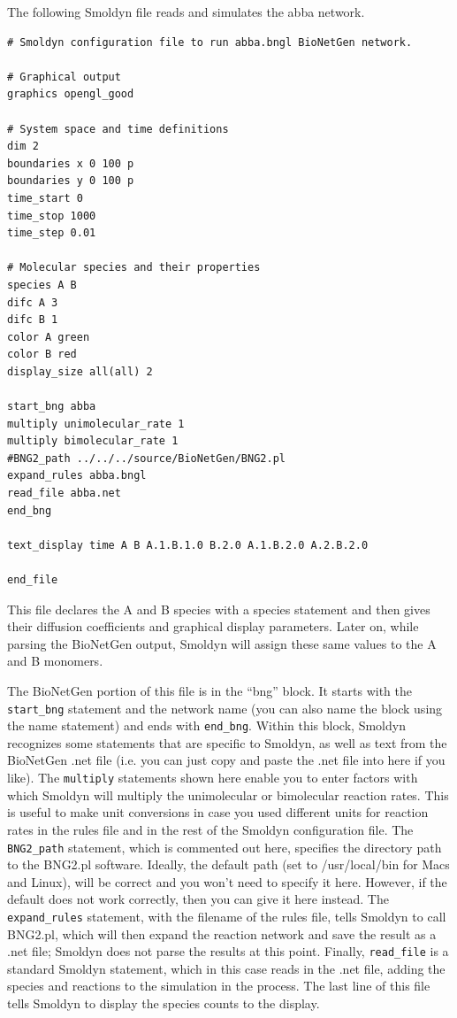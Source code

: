\documentclass {scrbook}
\newcommand {\ttt} {\texttt}
\begin{document}
The following Smoldyn file reads and simulates the abba network.

\begin{lstlisting}[style=SSAC]
# Smoldyn configuration file to run abba.bngl BioNetGen network.

# Graphical output
graphics opengl_good

# System space and time definitions
dim 2
boundaries x 0 100 p
boundaries y 0 100 p
time_start 0
time_stop 1000
time_step 0.01

# Molecular species and their properties
species A B
difc A 3
difc B 1
color A green
color B red
display_size all(all) 2

start_bng abba
multiply unimolecular_rate 1
multiply bimolecular_rate 1
#BNG2_path ../../../source/BioNetGen/BNG2.pl
expand_rules abba.bngl
read_file abba.net
end_bng

text_display time A B A.1.B.1.0 B.2.0 A.1.B.2.0 A.2.B.2.0

end_file
\end{lstlisting}

This file declares the A and B species with a species statement and then gives their diffusion coefficients and graphical display parameters. Later on, while parsing the BioNetGen output, Smoldyn will assign these same values to the A and B monomers.

The BioNetGen portion of this file is in the ``bng'' block. It starts with the \ttt{start\_bng} statement and the network name (you can also name the block using the name statement) and ends with \ttt{end\_bng}. Within this block, Smoldyn recognizes some statements that are specific to Smoldyn, as well as text from the BioNetGen .net file (i.e. you can just copy and paste the .net file into here if you like). The \ttt{multiply} statements shown here enable you to enter factors with which Smoldyn will multiply the unimolecular or bimolecular reaction rates. This is useful to make unit conversions in case you used different units for reaction rates in the rules file and in the rest of the Smoldyn configuration file. The \ttt{BNG2\_path} statement, which is commented out here, specifies the directory path to the BNG2.pl software. Ideally, the default path (set to /usr/local/bin for Macs and Linux), will be correct and you won't need to specify it here. However, if the default does not work correctly, then you can give it here instead. The \ttt{expand\_rules} statement, with the filename of the rules file, tells Smoldyn to call BNG2.pl, which will then expand the reaction network and save the result as a .net file; Smoldyn does not parse the results at this point. Finally, \ttt{read\_file} is a standard Smoldyn statement, which in this case reads in the .net file, adding the species and reactions to the simulation in the process. The last line of this file tells Smoldyn to display the species counts to the display.
\end{document}
